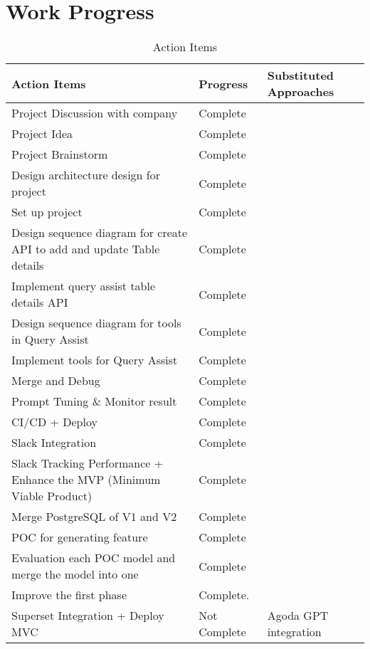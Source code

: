 \section{Work Progress}
\begin{table}[H]
    \centering
    \caption{Action Items}
    \label{tbl:task-breakdown}
    \begin{tabular}{|p{6cm}|p{3cm}|p{5cm}|}
        \hline
        \textbf{Action Items} & \textbf{Progress} & \textbf{Substituted Approaches}  \\
        \hline
        Project Discussion with company & Complete &  \\
        \hline
        Project Idea & Complete &  \\
        \hline
        Project Brainstorm & Complete & \\
        \hline
        Design architecture design for project & Complete & \\
        \hline
        Set up project & Complete & \\
        \hline
        Design sequence diagram for create API to add and update Table details & Complete & \\
        \hline
        Implement query assist table details API & Complete & \\
        \hline
        Design sequence diagram for tools in Query Assist & Complete & \\
        \hline
        Implement tools for Query Assist & Complete & \\
        \hline
        Merge and Debug & Complete & \\
        \hline
        Prompt Tuning \& Monitor result & Complete & \\
        \hline
        CI/CD + Deploy & Complete & \\
        \hline
        Slack Integration & Complete & \\
        \hline
        Slack Tracking Performance + Enhance the MVP (Minimum Viable Product) & Complete & \\
        \hline
        Merge PostgreSQL of V1 and V2 & Complete & \\
        \hline
        POC for generating feature & Complete & \\
        \hline
        Evaluation each POC model and merge the model into one & Complete & \\
        \hline
        Improve the first phase & Complete. & \\
        \hline
        Superset Integration + Deploy MVC & Not Complete & Agoda GPT integration\\

\end{tabular}
\end{table}
